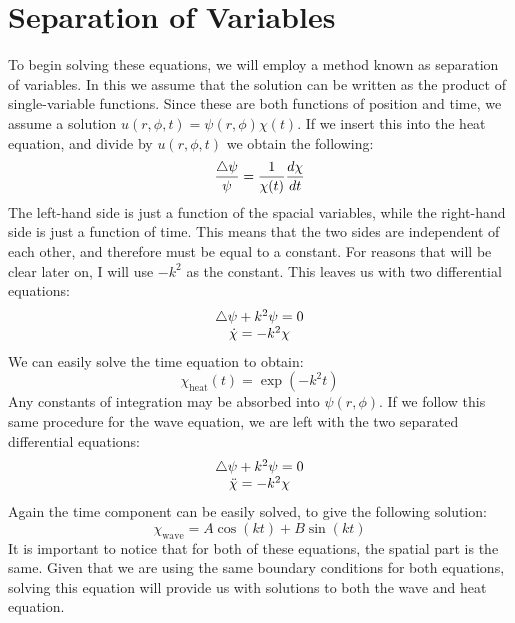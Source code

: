 \documentclass{article}
\begin{document}
\section{Separation of Variables}
To begin solving these equations, we will employ a method known as separation of variables. In this we assume that the solution can be written as the product of single-variable functions. Since these are both functions of position and time, we assume a solution $u(r,\phi,t)=\psi(r,\phi)\chi(t)$. If we insert this into the heat equation, and divide by $u(r,\phi,t)$ we obtain the following:
\begin{equation}
  \frac{\bigtriangleup \psi}{\psi} = \frac{1}{\chi(t)}\frac{d \chi}{d t}
\end{equation}
The left-hand side is just a function of the spacial variables, while the right-hand side is just a function of time. This means that the two sides are independent of each other, and therefore must be equal to a constant. For reasons that will be clear later on, I will use $-k^2$ as the constant. This leaves us with two differential equations:
\begin{equation}
  \begin{matrix}
    \bigtriangleup\psi+k^2\psi=0\\
    \dot{\chi}=-k^2 \chi
  \end{matrix}
\end{equation}
We can easily solve the time equation to obtain:
\begin{equation}
  \chi_{\mathrm{heat}}(t)=\exp(-k^2 t)
\end{equation}
Any constants of integration may be absorbed into $\psi(r,\phi)$. If we follow this same procedure for the wave equation, we are left with the two separated differential equations:
\begin{equation}
  \begin{matrix}
    \bigtriangleup\psi+k^2\psi=0\\
    \ddot{\chi}=-k^2 \chi
  \end{matrix}
\end{equation}
Again the time component can be easily solved, to give the following solution:
\begin{equation}
  \chi_{\mathrm{wave}}=A\cos(kt)+B\sin(kt)
\end{equation}
It is important to notice that for both of these equations, the spatial part is the same. Given that we are using the same boundary conditions for both equations, solving this equation will provide us with solutions to both the wave and heat equation.
\end{document}
